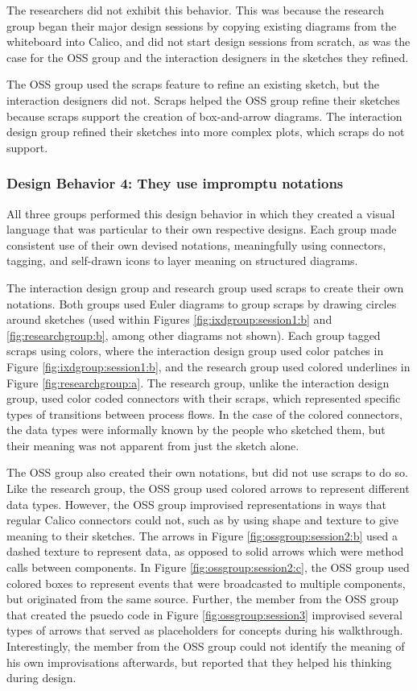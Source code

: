 The researchers did not exhibit this behavior. This was because the research group began their major design sessions by copying existing diagrams from the whiteboard into Calico, and did not start design sessions from scratch, as was the case for the OSS group and the interaction designers in the sketches they refined.

The OSS group used the scraps feature to refine an existing sketch, but the interaction designers did not. Scraps helped the OSS group refine their sketches because scraps support the creation of box-and-arrow diagrams. The interaction design group refined their sketches into more complex plots, which scraps do not support.

\subsubsection{Design Behavior 4: They use impromptu notations}

All three groups performed this design behavior in which they created a visual language that was particular to their own respective designs. Each group made consistent use of their own devised notations, meaningfully using connectors, tagging, and self-drawn icons to layer meaning on structured diagrams.

The interaction design group and research group used scraps to create their own notations. Both groups used Euler diagrams to group scraps by drawing circles around sketches (used within Figures \ref{fig:ixdgroup:session1:b} and \ref{fig:researchgroup:b}, among other diagrams not shown). Each group tagged scraps using colors, where the interaction design group used color patches in Figure \ref{fig:ixdgroup:session1:b}, and the research group used colored underlines in Figure \ref{fig:researchgroup:a}. The research group, unlike the interaction design group, used color coded connectors with their scraps, which represented specific types of transitions between process flows. In the case of the colored connectors, the data types were informally known by the people who sketched them, but their meaning was not apparent from just the sketch alone. 

The OSS group also created their own notations, but did not use scraps to do so. Like the research group, the OSS group used colored arrows to represent different data types. However, the OSS group improvised representations in ways that regular Calico connectors could not, such as by using shape and texture to give meaning to their sketches. The arrows in Figure \ref{fig:ossgroup:session2:b} used a dashed texture to represent data, as opposed to solid arrows which were method calls between components. In Figure \ref{fig:ossgroup:session2:c}, the OSS group used colored boxes to represent events that were broadcasted to multiple components, but originated from the same source. Further, the member from the OSS group that created the psuedo code in Figure \ref{fig:ossgroup:session3} improvised several types of arrows that served as placeholders for concepts during his walkthrough. Interestingly, the member from the OSS group could not identify the meaning of his own improvisations afterwards, but reported that they helped his thinking during design.

